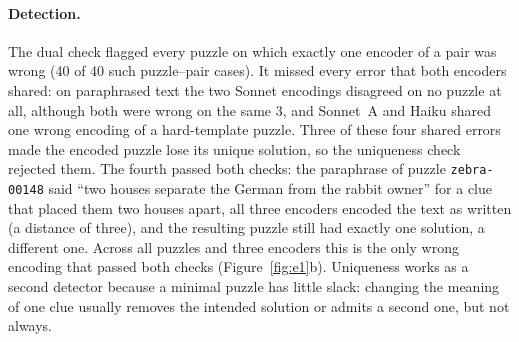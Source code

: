 \paragraph{Detection.} The dual check flagged every puzzle on which exactly one encoder of a pair was wrong (40 of 40 such puzzle--pair cases). It missed every error that both encoders shared: on paraphrased text the two Sonnet encodings disagreed on no puzzle at all, although both were wrong on the same 3, and Sonnet~A and Haiku shared one wrong encoding of a hard-template puzzle. Three of these four shared errors made the encoded puzzle lose its unique solution, so the uniqueness check rejected them. The fourth passed both checks: the paraphrase of puzzle \texttt{zebra-00148} said ``two houses separate the German from the rabbit owner'' for a clue that placed them two houses apart, all three encoders encoded the text as written (a distance of three), and the resulting puzzle still had exactly one solution, a different one. Across all \EOneN puzzles and three encoders this is the only wrong encoding that passed both checks (Figure~\ref{fig:e1}b). Uniqueness works as a second detector because a minimal puzzle has little slack: changing the meaning of one clue usually removes the intended solution or admits a second one, but not always.

